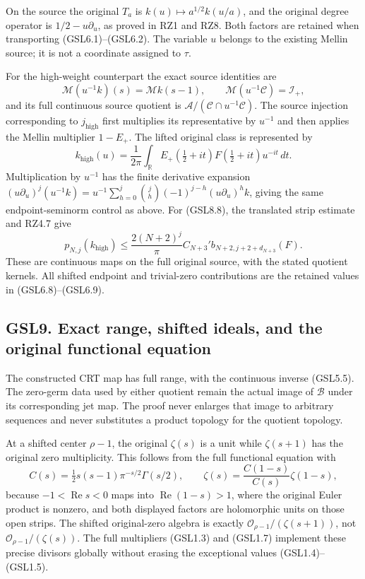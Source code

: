 On the source the original \(T_a\) is \(k(u)\mapsto a^{1/2}k(u/a)\), and
the original degree operator is \(1/2-u\partial_u\), as proved in RZ1
and RZ8. Both factors are retained when transporting (GSL6.1)--(GSL6.2).
The variable \(u\) belongs to the existing Mellin source; it is not a
coordinate assigned to \(\tau\).

For the high-weight counterpart the exact source identities are \[
\mathcal M(u^{-1}k)(s)=\mathcal Mk(s-1),\qquad
\mathcal M(u^{-1}\mathcal C)=\mathcal I_+,
\tag{GSL8.7}
\] and its full continuous source quotient is
\(\mathcal A/(\mathcal C\cap u^{-1}\mathcal C)\). The source injection
corresponding to \(j_{\mathrm{high}}\) first multiplies its
representative by \(u^{-1}\) and then applies the Mellin multiplier
\(1-E_+\). The lifted original class is represented by \[
k_{\mathrm{high}}(u)=\frac1{2\pi}\int_{\mathbb R}
 E_+(\tfrac12+it)F(\tfrac12+it)u^{-it}\,dt.
\tag{GSL8.8}
\] Multiplication by \(u^{-1}\) has the finite derivative expansion
\((u\partial_u)^j(u^{-1}k)=u^{-1}\sum_{h=0}^j\binom jh(-1)^{j-h}(u\partial_u)^hk\),
giving the same endpoint-seminorm control as above. For (GSL8.8), the
translated strip estimate and RZ4.7 give \[
p_{N,j}(k_{\mathrm{high}})\le
 \frac{2(N+2)^j}{\pi}C_{N+3}'
 b_{N+2,j+2+d_{N+3}}(F).
\tag{GSL8.9}
\] These are continuous maps on the full original source, with the
stated quotient kernels. All shifted endpoint and trivial-zero
contributions are the retained values in (GSL6.8)--(GSL6.9).

\subsection{GSL9. Exact range, shifted ideals, and the original
functional
equation}\label{gsl9.-exact-range-shifted-ideals-and-the-original-functional-equation}

The constructed CRT map has full range, with the continuous inverse
(GSL5.5). The zero-germ data used by either quotient remain the actual
image of \(\mathcal B\) under its corresponding jet map. The proof never
enlarges that image to arbitrary sequences and never substitutes a
product topology for the quotient topology.

At a shifted center \(\rho-1\), the original \(\zeta(s)\) is a unit
while \(\zeta(s+1)\) has the original zero multiplicity. This follows
from the full functional equation with \[
C(s)=\tfrac12s(s-1)\pi^{-s/2}\Gamma(s/2),\qquad
\zeta(s)=\frac{C(1-s)}{C(s)}\zeta(1-s),
\tag{GSL9.1}
\] because \(-1<\operatorname{Re}s<0\) maps into
\(\operatorname{Re}(1-s)>1\), where the original Euler product is
nonzero, and both displayed factors are holomorphic units on those open
strips. The shifted original-zero algebra is exactly
\(\mathcal O_{\rho-1}/(\zeta(s+1))\), not
\(\mathcal O_{\rho-1}/(\zeta(s))\). The full multipliers (GSL1.3) and
(GSL1.7) implement these precise divisors globally without erasing the
exceptional values (GSL1.4)--(GSL1.5).

